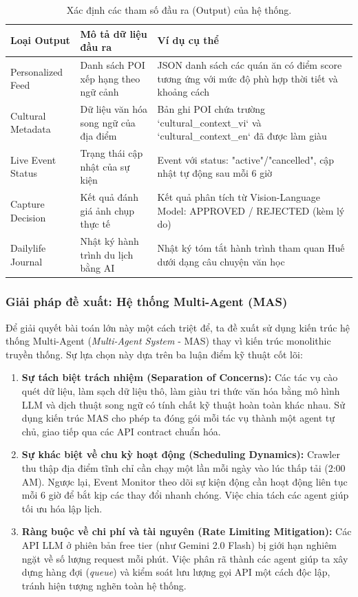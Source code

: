 \begin{table}[H]
\centering
\begin{tabularx}{\textwidth}{l p{3.2cm} X}
\toprule
\textbf{Loại Output} & \textbf{Mô tả dữ liệu đầu ra} & \textbf{Ví dụ cụ thể} \\
\midrule
Personalized Feed & Danh sách POI xếp hạng theo ngữ cảnh & JSON danh sách các quán ăn có điểm score tương ứng với mức độ phù hợp thời tiết và khoảng cách \\
Cultural Metadata & Dữ liệu văn hóa song ngữ của địa điểm & Bản ghi POI chứa trường `cultural\_context\_vi` và `cultural\_context\_en` đã được làm giàu \\
Live Event Status & Trạng thái cập nhật của sự kiện & Event với status: "active"/"cancelled", cập nhật tự động sau mỗi 6 giờ \\
Capture Decision & Kết quả đánh giá ảnh chụp thực tế & Kết quả phân tích từ Vision-Language Model: APPROVED / REJECTED (kèm lý do) \\
Dailylife Journal & Nhật ký hành trình du lịch bằng AI & Nhật ký tóm tắt hành trình tham quan Huế dưới dạng câu chuyện văn học \\
\bottomrule
\end{tabularx}
\caption{Xác định các tham số đầu ra (Output) của hệ thống.}
\label{tab:outputs_definition}
\end{table}

\subsubsection{Giải pháp đề xuất: Hệ thống Multi-Agent (MAS)}

Để giải quyết bài toán lớn này một cách triệt để, ta đề xuất sử dụng kiến trúc hệ thống Multi-Agent (\textit{Multi-Agent System} - MAS) thay vì kiến trúc monolithic truyền thống. Sự lựa chọn này dựa trên ba luận điểm kỹ thuật cốt lõi:
\begin{enumerate}
    \item \textbf{Sự tách biệt trách nhiệm (Separation of Concerns):} Các tác vụ cào quét dữ liệu, làm sạch dữ liệu thô, làm giàu tri thức văn hóa bằng mô hình LLM và dịch thuật song ngữ có tính chất kỹ thuật hoàn toàn khác nhau. Sử dụng kiến trúc MAS cho phép ta đóng gói mỗi tác vụ thành một agent tự chủ, giao tiếp qua các API contract chuẩn hóa.
    \item \textbf{Sự khác biệt về chu kỳ hoạt động (Scheduling Dynamics):} Crawler thu thập địa điểm tĩnh chỉ cần chạy một lần mỗi ngày vào lúc thấp tải (2:00 AM). Ngược lại, Event Monitor theo dõi sự kiện động cần hoạt động liên tục mỗi 6 giờ để bắt kịp các thay đổi nhanh chóng. Việc chia tách các agent giúp tối ưu hóa lập lịch.
    \item \textbf{Ràng buộc về chi phí và tài nguyên (Rate Limiting Mitigation):} Các API LLM ở phiên bản free tier (như Gemini 2.0 Flash) bị giới hạn nghiêm ngặt về số lượng request mỗi phút. Việc phân rã thành các agent giúp ta xây dựng hàng đợi (\textit{queue}) và kiểm soát lưu lượng gọi API một cách độc lập, tránh hiện tượng nghẽn toàn hệ thống.
\end{enumerate}

